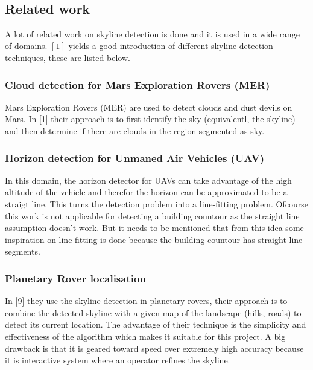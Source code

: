 \documentclass[10pt]{article}
\begin{document}
\\
 \subsection{Related work}
A lot of related work on skyline detection is done and it is used in a wide
range of domains. $[1]$ yields a good introduction of different skyline
detection techniques, these are listed below.

\subsubsection{Cloud detection for Mars Exploration Rovers (MER)}
Mars Exploration Rovers (MER) are used to detect clouds and dust devils on Mars.
In [1] their approach is to first identify the sky (equivalentl, the skyline)
and then determine if there are clouds in the region segmented as sky.

\subsubsection{Horizon detection for Unmaned Air Vehicles (UAV)}
In this domain, the horizon detector for UAVs can take advantage of the high
altitude of the vehicle and therefor the horizon can be approximated to be a
straigt line.  This turns the detection problem into a line-fitting problem.
Ofcourse this work is not applicable for detecting a building countour as the
straight line assumption doesn't work. But it needs to be mentioned that from this
idea some inspiration on line fitting is done because the building countour has
straight line segments.

\subsubsection{Planetary Rover localisation}
In [9] they use the skyline detection in planetary rovers, their approach is to
combine the detected skyline with a given map of the landscape (hills, roads) to
detect its current location. 
The advantage of their technique is the simplicity and effectiveness of the
algorithm which makes it suitable for this project.  A big drawback is that it
is geared toward speed over extremely high accuracy because it is 
interactive system where an operator refines the skyline.
\end{document}
